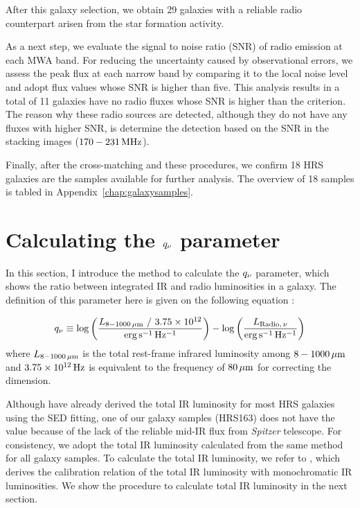 After this galaxy selection, we obtain 29 galaxies with a reliable radio counterpart arisen from the star formation activity.

As a next step, we evaluate the signal to noise ratio (SNR) of radio emission at each MWA band.
For reducing the uncertainty caused by observational errors, we assess the peak flux at each narrow band by comparing it to the local noise level and adopt flux values whose SNR is higher than five.
This analysis results in a total of 11 galaxies have no radio fluxes whose SNR is higher than the criterion.
The reason why these radio sources are detected, although they do not have any fluxes with higher SNR, is \citet{Hurley-Walker2017a} determine the detection based on the SNR in the stacking images ($170-231\,\mathrm{MHz}$).

Finally, after the cross-matching and these procedures, we confirm 18 HRS galaxies are the samples available for further analysis.
The overview of 18 samples is tabled in Appendix~\ref{chap:galaxysamples}.



\section{Calculating the $q_{\nu}$ parameter}\label{sec:calculatingq}
In this section, I introduce the method to calculate the $q_{\nu}$ parameter, which shows the ratio between integrated IR and radio luminosities in a galaxy.
The definition of this parameter here is given on the following equation \citep[e.g.,][]{Helou1985, Bell2003, CalistroRivera2017a}:

\begin{equation}\label{eq:q_def}
    q_{\nu} \equiv \log\left(\frac{L_{\mathrm{8-1000\,\mu m}}\ /\ 3.75 \times 10^{12}}{{\rm erg\,s^{-1}\,Hz^{-1}}}\right) - \log\left(\frac{L_{\mathrm{Radio},\,\nu}}{{\rm erg\,s^{-1}\,Hz^{-1}}}\right)
\end{equation}
where $L_{\mathrm{8-1000\,\mu m}}$ is the total rest-frame infrared luminosity among $8 - 1000\,\mathrm{\mu m}$ and $3.75\times10^{12}\,\mathrm{Hz}$ is equivalent to the frequency of $80\,\mathrm{\mu m}$ for correcting the dimension.

Although \citet{Ciesla2014} have already derived the total IR luminosity for most HRS galaxies using the SED fitting, one of our galaxy samples (HRS163) does not have the value because of the lack of the reliable mid-IR flux from {\it Spitzer\/} telescope.
For consistency, we adopt the total IR luminosity calculated from the same method for all galaxy samples.
To calculate the total IR luminosity, we refer to \citet{Galametz2013}, which derives the calibration relation of the total IR luminosity with monochromatic IR luminosities.
We show the procedure to calculate total IR luminosity in the next section.



